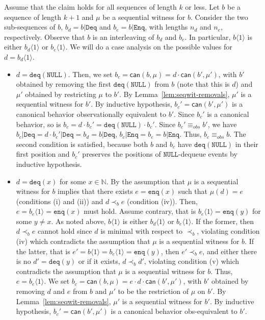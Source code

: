 \documentclass{LMCS}
\newcommand{\NULL}{\ensuremath{\mathtt{NULL}}}
\newcommand{\enq}{\ensuremath{\mathtt{enq}}}
\newcommand{\deq}{\ensuremath{\mathtt{deq}}}
\newcommand{\seqx}[2]{\ensuremath{#1\langle #2\rangle}}
\newcommand{\enqset}{\ensuremath{\mathtt{Enq}}}
\newcommand{\deqset}{\ensuremath{\mathtt{Deq}}}
\newcommand{\obsequiv}{\ensuremath{\equiv_{\mathit{obs}}}}
\begin{document}
Assume that the claim holds for all sequences of length $k$ or less.
Let $b$ be a sequence of length $k+1$ and $\mu$ be a sequential witness for $b$.
Consider the two sub-sequences of $b$, $b_d=b|\deqset$ and $b_e=b|\enqset$, with lengths $n_d$ and $n_e$, respectively.
Observe that $b$ is an interleaving of $b_d$ and $b_e$.
In particular, $\seqx b 1$ is either $\seqx {b_d} 1$ or $\seqx {b_e} 1$.
We will do a case analysis on the possible values for $d=\seqx {b_d} 1$.
\begin{itemize}
\item $d=\deq(\NULL)$.
Then, we set $b_c=\mathsf{can}(b,\mu)=d\cdot \mathsf{can}(b',\mu')$, with $b'$ obtained by removing the first $\deq(\NULL)$ from $b$ (note that this is $d$) and $\mu'$ obtained by restricting $\mu$ to $b'$.
By Lemma~\ref{lem:seqwit-removals}, $\mu'$ is a sequential witness for $b'$.
By inductive hypothesis, $b_c'=\mathsf{can}(b',\mu')$ is a canonical behavior observationally equivalent to $b'$.
Since $b_c'$ is a canonical behavior, so is $b_c=d\cdot b_c'=\deq(\NULL)\cdot b_c'$.
Since $b_c'\obsequiv b'$, we have $b_c|\deqset=d\cdot b_c'|\deqset=b_d=b|\deqset$, $b_c|\enqset=b_e=b|\enqset$.
Thus, $b_c\obsequiv b$.
The second condition is satisfied, because both $b$ and $b_c$ have $\deq(\NULL)$ in their first position and $b_c'$ preserves the positions of {\NULL}-dequeue events by inductive hypothesis.
\item $d=\deq(x)$ for some $x\in\mathbb{N}$.
By the assumption that $\mu$ is a sequential witness for $b$ implies that there exists $e=\enq(x)$ such that $\mu(d)=e$ (conditions (i) and (ii)) and $d\prec_b e$ (condition (iv)).
Then, $e=\seqx {b_e} 1=\enq(x)$ must hold.
Assume contrary, that is $\seqx {b_e} 1=\enq(y)$ for some $y\neq x$.
As noted above, $\seqx b 1$ is either $\seqx {b_d} 1$ or $\seqx {b_e} 1$.
If the former, then $d\prec_b e$ cannot hold since $d$ is minimal with respect to $\prec_b$, violating condition (iv) which contradicts the assumption that $\mu$ is a sequential witness for $b$.
If the latter, that is $e'=\seqx b 1=\seqx {b_e} 1=\enq(y)$, then $e'\prec_b e$, and either there is no $d'=\deq(y)$ or if it exists, $d\prec_b d'$, violating condition (v) which contradicts the assumption that $\mu$ is a sequential witness for $b$.
Thus, $e=\seqx {b_e} 1$. 
We set $b_c=\mathsf{can}(b,\mu)=e\cdot d\cdot \mathsf{can}(b',\mu')$, with $b'$ obtained by removing $d$ and $e$ from $b$ and $\mu'$ to be the restriction of $\mu$ on $b'$.
By Lemma~\ref{lem:seqwit-removals}, $\mu'$ is a sequential witness for $b'$.
By inductive hypothesis, $b_c'=\mathsf{can}(b',\mu')$ is a canonical behavior obs-equivalent to $b'$.

\end{itemize}
\end{document}
